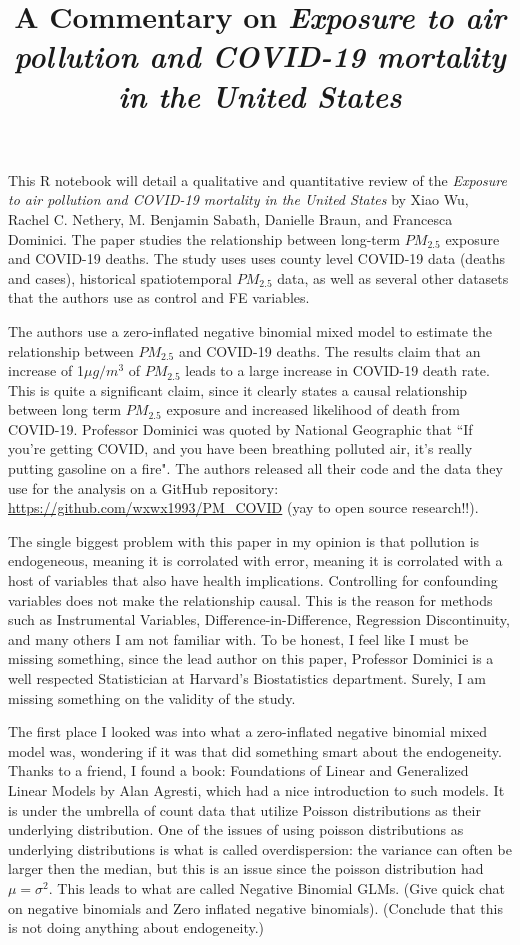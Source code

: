 \documentclass[]{article}
\title{A Commentary on \emph{Exposure to air pollution and COVID-19 mortality
in the United States}}
\author{}
\date{\vspace{-2.5em}}
\begin{document}
\maketitle

This R notebook will detail a qualitative and quantitative review of the
\emph{Exposure to air pollution and COVID-19 mortality in the United
States} by Xiao Wu, Rachel C. Nethery, M. Benjamin Sabath, Danielle
Braun, and Francesca Dominici. The paper studies the relationship
between long-term \(PM_{2.5}\) exposure and COVID-19 deaths. The study
uses uses county level COVID-19 data (deaths and cases), historical
spatiotemporal \(PM_{2.5}\) data, as well as several other datasets that
the authors use as control and FE variables.

The authors use a zero-inflated negative binomial mixed model to
estimate the relationship between \(PM_{2.5}\) and COVID-19 deaths. The
results claim that an increase of 1\(\mu g/m^3\) of \(PM_{2.5}\) leads
to a large increase in COVID-19 death rate. This is quite a significant
claim, since it clearly states a causal relationship between long term
\(PM_{2.5}\) exposure and increased likelihood of death from COVID-19.
Professor Dominici was quoted by National Geographic that ``If you're
getting COVID, and you have been breathing polluted air, it's really
putting gasoline on a fire". The authors released all their code and the
data they use for the analysis on a GitHub repository:
\url{https://github.com/wxwx1993/PM_COVID} (yay to open source
research!!).

The single biggest problem with this paper in my opinion is that
pollution is endogeneous, meaning it is corrolated with error, meaning
it is corrolated with a host of variables that also have health
implications. Controlling for confounding variables does not make the
relationship causal. This is the reason for methods such as Instrumental
Variables, Difference-in-Difference, Regression Discontinuity, and many
others I am not familiar with. To be honest, I feel like I must be
missing something, since the lead author on this paper, Professor
Dominici is a well respected Statistician at Harvard's Biostatistics
department. Surely, I am missing something on the validity of the study.

The first place I looked was into what a zero-inflated negative binomial
mixed model was, wondering if it was that did something smart about the
endogeneity. Thanks to a friend, I found a book: Foundations of Linear
and Generalized Linear Models by Alan Agresti, which had a nice
introduction to such models. It is under the umbrella of count data that
utilize Poisson distributions as their underlying distribution. One of
the issues of using poisson distributions as underlying distributions is
what is called overdispersion: the variance can often be larger then the
median, but this is an issue since the poisson distribution had
\(\mu = \sigma^2\). This leads to what are called Negative Binomial
GLMs. (Give quick chat on negative binomials and Zero inflated negative
binomials). (Conclude that this is not doing anything about
endogeneity.)
\end{document}
